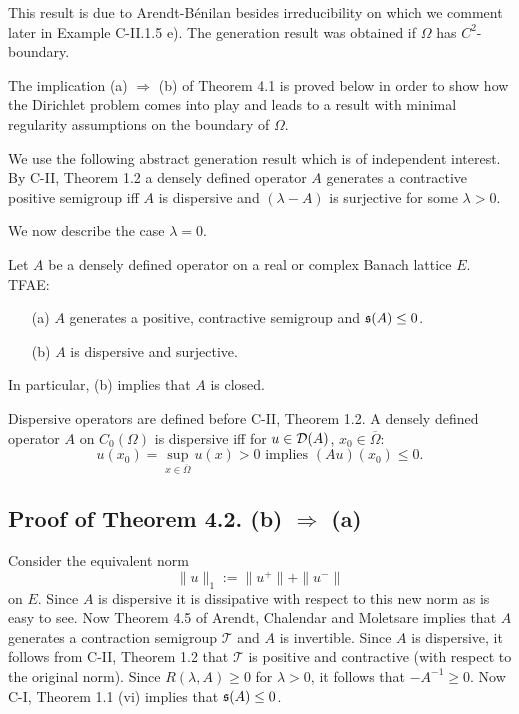 This result is due to Arendt-Bénilan \cite{ArBe99} besides irreducibility on which we comment later in Example C-II.1.5 e). The generation result was obtained if $\Omega$ has $C^2$-boundary.

The implication (a) $\Rightarrow$ (b) of Theorem 4.1 is proved below in order to show how the Dirichlet problem comes into play and leads to a result with minimal regularity assumptions on the boundary of $\Omega$.

We use the following abstract generation result which is of independent interest. By C-II, Theorem 1.2 a densely defined operator $A$ generates a contractive positive semigroup iff $A$ is dispersive and $(\lambda - A)$ is surjective for some $\lambda > 0$.

We now describe the case $\lambda = 0$.

\begin{theorem}[4.2]
Let $A$ be a densely defined operator on a real or complex Banach lattice $E$. TFAE:
\begin{enumerate}
\item[(a)] $A$ generates a positive, contractive semigroup and $\mathfrak{s}(A) \leq 0$.
\item[(b)] $A$ is dispersive and surjective.
\end{enumerate}
In particular, (b) implies that $A$ is closed.
\end{theorem}

Dispersive operators are defined before C-II, Theorem 1.2. A densely defined operator $A$ on $C_0(\Omega)$ is dispersive iff for $u \in \mathcal{D}(A)$, $x_0 \in \overline{\Omega}$:
\[u(x_0) = \sup_{x \in \overline{\Omega}} u(x) > 0 \text{ implies } (Au)(x_0) \leq 0.\]

\subsection{Proof of Theorem 4.2. (b) $\Rightarrow$ (a)}

Consider the equivalent norm
\[\|u\|_1 := \|u^+\| + \|u^-\|\]
on $E$. Since $A$ is dispersive it is dissipative with respect to this new norm as is easy to see. Now Theorem 4.5 of Arendt, Chalendar and Moletsare \cite{ACM24} implies that $A$ generates a contraction semigroup $\mathcal{T}$ and $A$ is invertible. Since $A$ is dispersive, it follows from C-II, Theorem 1.2 that $\mathcal{T}$ is positive and contractive (with respect to the original norm). Since $R(\lambda, A) \geq 0$ for $\lambda > 0$, it follows that $-A^{-1} \geq 0$. Now C-I, Theorem 1.1 (vi) implies that $\mathfrak{s}(A) \leq 0$.

